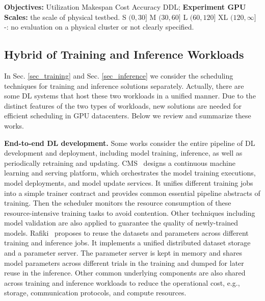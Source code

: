 \begin{table}[t]
    \begin{flushleft}
        \begin{tablenotes}
            \scriptsize
            \textbf{Objectives:}  Utilization  Makespan  Cost  Accuracy  DDL; \hspace{10pt}  \textbf{Experiment GPU Scales:} the scale of physical testbed. S $(0, 30]$ M $(30, 60]$ L $(60, 120]$ XL $(120, \infty]$ -: no evaluation on a physical cluster or not clearly specified.
        \end{tablenotes}
    \end{flushleft}

    \vspace{-10pt}
    \label{tab_other}
\end{table}


\subsection{Hybrid of Training and Inference Workloads}
In Sec. \ref{sec_training} and Sec. \ref{sec_inference} we consider the scheduling techniques for training and inference solutions separately. Actually, there are some DL systems that host these two workloads in a unified manner. Due to the distinct features of the two types of workloads, new solutions are needed for efficient scheduling in GPU datacenters. Below we review and summarize these works.


\textbf{End-to-end DL development.}
Some works consider the entire pipeline of DL development and deployment, including model training, inference, as well as periodically retraining and updating.
CMS~\cite{li2020cms} designs a continuous machine learning and serving platform, which orchestrates the model training executions, model deployments, and model update services. It unifies different training jobs into a simple trainer contract and provides common essential pipeline abstracts of training. Then the scheduler monitors the resource consumption of these resource-intensive training tasks to avoid contention. Other techniques including model validation are also applied to guarantee the quality of newly-trained models.
Rafiki~\cite{wang2018rafiki} proposes to reuse the datasets and parameters across different training and inference jobs. It implements a unified distributed dataset storage and a parameter server. The parameter server is kept in memory and shares model parameters across different trials in the training and dumped for later reuse in the inference. Other common underlying components are also shared across training and inference workloads to reduce the operational cost, e.g., storage, communication protocols, and compute resources.







